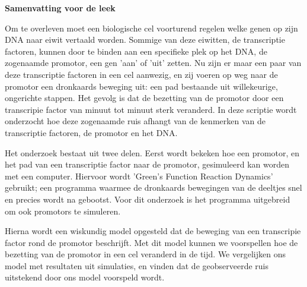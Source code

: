 \begin{center}
{\center \bf Samenvatting voor de leek}
\end{center}

Om te overleven moet een biologische cel voorturend regelen welke genen op zijn DNA naar eiwit vertaald worden. Sommige van deze eiwitten, de transcriptie factoren, kunnen door te binden aan een specifieke plek op het DNA, de zogenaamde promotor, een gen 'aan' of 'uit' zetten. Nu zijn er maar een paar van deze transcriptie factoren in een cel aanwezig, en zij voeren op weg naar de promotor een dronkaards beweging uit: een pad bestaande uit willekeurige, ongerichte stappen. Het gevolg is dat de bezetting van de promotor door een transcripie factor van minuut tot minuut sterk veranderd.  In deze scriptie wordt onderzocht hoe deze zogenaamde ruis afhangt van de kenmerken van de transcriptie factoren, de promotor en het DNA. 

Het onderzoek bestaat uit twee delen. Eerst wordt bekeken hoe een promotor,  en het pad van een transcriptie factor naar de promotor, gesimuleerd kan worden met een computer. Hiervoor wordt 'Green's Function Reaction Dynamics' gebruikt; een programma waarmee de dronkaards bewegingen van de deeltjes snel en precies wordt na gebootst. Voor dit onderzoek is het programma uitgebreid om ook promotors te simuleren. 

Hierna wordt een wiskundig model opgesteld dat de beweging van een transcripie factor rond de promotor beschrijft. Met dit model kunnen we  voorspellen hoe de bezetting van de promotor in een cel veranderd in de tijd. We vergelijken ons model met resultaten uit simulaties, en vinden dat de geobserveerde ruis uitstekend door ons model voorspeld wordt.